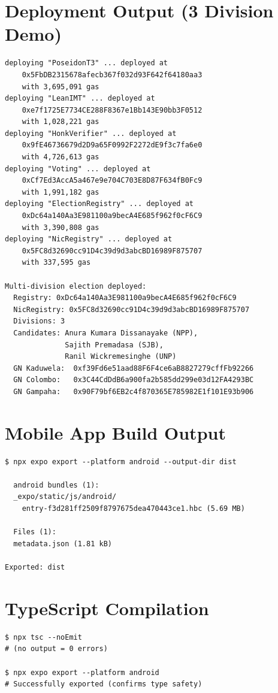 \section{Deployment Output (3 Division Demo)}

\begin{lstlisting}[caption={Multi-division deployment output}]
deploying "PoseidonT3" ... deployed at
    0x5FbDB2315678afecb367f032d93F642f64180aa3
    with 3,695,091 gas
deploying "LeanIMT" ... deployed at
    0xe7f1725E7734CE288F8367e1Bb143E90bb3F0512
    with 1,028,221 gas
deploying "HonkVerifier" ... deployed at
    0x9fE46736679d2D9a65F0992F2272dE9f3c7fa6e0
    with 4,726,613 gas
deploying "Voting" ... deployed at
    0xCf7Ed3AccA5a467e9e704C703E8D87F634fB0Fc9
    with 1,991,182 gas
deploying "ElectionRegistry" ... deployed at
    0xDc64a140Aa3E981100a9becA4E685f962f0cF6C9
    with 3,390,808 gas
deploying "NicRegistry" ... deployed at
    0x5FC8d32690cc91D4c39d9d3abcBD16989F875707
    with 337,595 gas

Multi-division election deployed:
  Registry: 0xDc64a140Aa3E981100a9becA4E685f962f0cF6C9
  NicRegistry: 0x5FC8d32690cc91D4c39d9d3abcBD16989F875707
  Divisions: 3
  Candidates: Anura Kumara Dissanayake (NPP),
              Sajith Premadasa (SJB),
              Ranil Wickremesinghe (UNP)
  GN Kaduwela:  0xf39Fd6e51aad88F6F4ce6aB8827279cffFb92266
  GN Colombo:   0x3C44CdDdB6a900fa2b585dd299e03d12FA4293BC
  GN Gampaha:   0x90F79bf6EB2c4f870365E785982E1f101E93b906
\end{lstlisting}

\section{Mobile App Build Output}

\begin{lstlisting}[caption={Expo export output confirming successful build}]
$ npx expo export --platform android --output-dir dist

  android bundles (1):
  _expo/static/js/android/
    entry-f3d281ff2509f8797675dea470443ce1.hbc (5.69 MB)

  Files (1):
  metadata.json (1.81 kB)

Exported: dist
\end{lstlisting}

\section{TypeScript Compilation}

\begin{lstlisting}[caption={Zero TypeScript errors across all packages}]
$ npx tsc --noEmit
# (no output = 0 errors)

$ npx expo export --platform android
# Successfully exported (confirms type safety)
\end{lstlisting}
